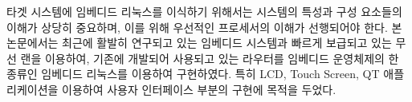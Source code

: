 타겟 시스템에 임베디드 리눅스를 이식하기 위해서는 시스템의 특성과 구성 요소들의 이해가 상당히 중요하며, 이를 위해 우선적인 프로세서의 이해가 선행되어야 한다. 본 논문에서는 최근에 활발히 연구되고 있는 임베디드 시스템과 빠르게 보급되고 있는 무선 랜을 이용하여, 기존에 개발되어 사용되고 있는 라우터를 임베디드 운영체제의 한 종류인 임베디드 리눅스를 이용하여 구현하였다. 특히 LCD, Touch Screen, QT 애플리케이션을 이용하여 사용자 인터페이스 부분의 구현에 목적을 두었다. 
